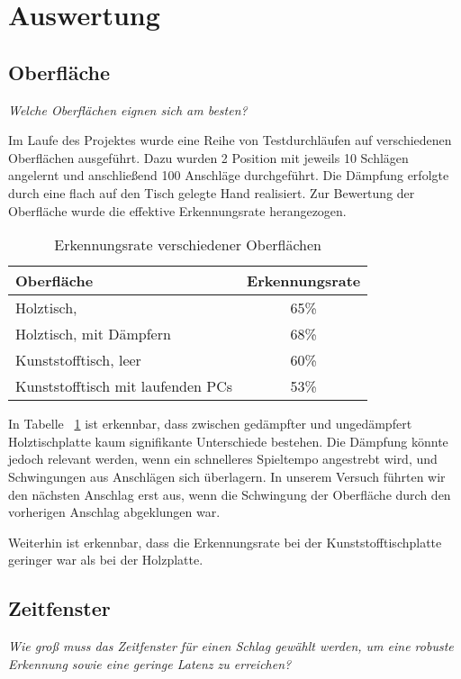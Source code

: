 \section{Auswertung}
\subsection{Oberfläche}
\textit{Welche Oberflächen eignen sich am besten?}

Im Laufe des Projektes wurde eine Reihe von Testdurchläufen auf verschiedenen Oberflächen ausgeführt. Dazu wurden 2 Position mit jeweils 10 Schlägen angelernt und anschließend 100 Anschläge durchgeführt. Die Dämpfung erfolgte durch eine flach auf den Tisch gelegte Hand realisiert. Zur Bewertung der Oberfläche wurde die effektive Erkennungsrate herangezogen.


\begin{table}[H]   
	\centering
     
     \caption{Erkennungsrate verschiedener Oberflächen}
     \label{tab:surf}
\begin{tabular}{l c}
Oberfläche & Erkennungsrate \\
\hline
Holztisch, & 65\% \\
Holztisch, mit Dämpfern & 68\% \\
Kunststofftisch, leer & 60\% \\
Kunststofftisch mit laufenden PCs & 53\% \\

\end{tabular}
\end{table}



In Tabelle ~\ref{tab:surf} ist erkennbar, dass zwischen gedämpfter und ungedämpfert Holztischplatte kaum signifikante Unterschiede bestehen. Die Dämpfung könnte jedoch relevant werden, wenn ein schnelleres Spieltempo angestrebt wird, und Schwingungen aus Anschlägen sich überlagern. In unserem Versuch führten wir den nächsten Anschlag erst aus, wenn die Schwingung der Oberfläche durch den vorherigen Anschlag abgeklungen war.

Weiterhin ist erkennbar, dass die Erkennungsrate bei der Kunststofftischplatte geringer war als bei der Holzplatte.


\subsection{Zeitfenster}
\label{sec:zeitfenster}
\textit{Wie groß muss das Zeitfenster für einen Schlag gewählt werden, um eine robuste Erkennung sowie eine geringe Latenz zu erreichen?}

